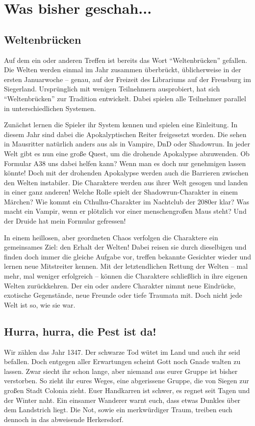 \documentclass[final]{multiversum}
\begin{document}
\makemultititle
%

\section{Was bisher geschah...}

\subsection{Weltenbrücken}
Auf dem ein oder anderen Treffen ist bereits das Wort \enquote{Weltenbrücken} gefallen.
Die Welten werden einmal im Jahr zusammen überbrückt, üblicherweise in der ersten Januarwoche -- genau, auf der Freizeit des Librariums auf der Freusburg im Siegerland.
Ursprünglich mit wenigen Teilnehmern ausprobiert, hat sich \enquote{Weltenbrücken} zur Tradition entwickelt.
Dabei spielen alle Teilnehmer parallel in unterschiedlichen Systemen.

Zunächst lernen die Spieler ihr System kennen und spielen eine Einleitung.
In diesem Jahr sind dabei die Apokalyptischen Reiter freigesetzt worden.
Die sehen in Mausritter natürlich anders aus als in Vampire, DnD oder Shadowrun.
In jeder Welt gibt es nun eine große Quest, um die drohende Apokalypse abzuwenden.
Ob Formular A38 uns dabei helfen kann? Wenn man es doch nur genehmigen lassen könnte!
Doch mit der drohenden Apokalypse werden auch die Barrieren zwischen den Welten instabiler.
Die Charaktere werden aus ihrer Welt gesogen und landen in einer ganz anderen!
Welche Rolle spielt der Shadowrun-Charakter in einem Märchen?
Wie kommt ein Cthulhu-Charakter im Nachtclub der 2080er klar?
Was macht ein Vampir, wenn er plötzlich vor einer menschengroßen Maus steht?
Und der Druide hat mein Formular gefressen!

In einem heillosen, aber geordneten Chaos verfolgen die Charaktere ein gemeinsames Ziel: den Erhalt der Welten!
Dabei reisen sie durch dieselbigen und finden doch immer die gleiche Aufgabe vor, treffen bekannte Gesichter wieder und lernen neue Mitstreiter kennen.
Mit der letztendlichen Rettung der Welten -- mal mehr, mal weniger erfolgreich -- können die Charaktere schließlich in ihre eigenen Welten zurückkehren.
Der ein oder andere Charakter nimmt neue Eindrücke, exotische Gegenstände, neue Freunde oder tiefe Traumata mit.
Doch nicht jede Welt ist so, wie sie war.

\subsection{Hurra, hurra, die Pest ist da!}
Wir zählen das Jahr 1347. 
Der schwarze Tod wütet im Land und auch ihr seid befallen.
Doch entgegen aller Erwartungen scheint Gott noch Gnade walten zu lassen.
Zwar siecht ihr schon lange, aber niemand aus eurer Gruppe ist bisher verstorben.
So zieht ihr eures Weges, eine abgerissene Gruppe, die von Siegen zur großen Stadt Colonia zieht.
Euer Handkarren ist schwer, es regnet seit Tagen und der Winter naht.
Ein einsamer Wanderer warnt euch, dass etwas Dunkles über dem Landstrich liegt.
Die Not, sowie ein merkwürdiger Traum, treiben euch dennoch in das abweisende Herkersdorf.
\end{document}
